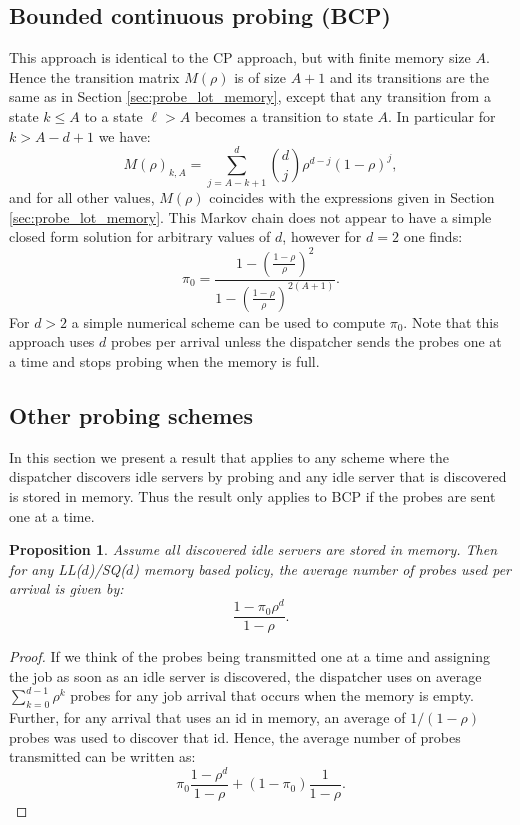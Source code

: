 \documentclass[12pt]{report}
\newtheorem{proposition}[theorem]{Proposition}
\begin{document}
\subsection{Bounded continuous probing (BCP)}
This approach is identical to the CP approach, but with finite memory size $A$. 
Hence the transition matrix $M(\rho)$ is of size $A+1$ and its transitions are the same as in Section \ref{sec:probe_lot_memory}, except that any transition from a state $k \leq A$
to a state $\ell > A$ becomes a transition to state $A$. In particular for $k > A-d+1$ we have:
$$
M(\rho)_{k,A}
=
\sum_{j=A-k+1}^d \binom{d}{j} \rho^{d-j} (1-\rho)^{j},
$$
and for all other values, $M(\rho)$ coincides with the expressions given in Section \ref{sec:probe_lot_memory}. This Markov chain does not appear to have a simple closed form solution for arbitrary values of $d$, however for $d=2$ one finds: 
$$
\pi_0=\frac{1-\left(\frac{1-\rho}{\rho}\right)^2}{1-\left(\frac{1-\rho}{\rho}\right)^{2(A+1)}}.
$$
For $d>2$ a simple numerical scheme can be used to compute $\pi_0$. 
Note that this approach uses $d$ probes per arrival unless the dispatcher sends the probes one at a
time and stops probing when the memory is full.

\subsection{Other probing schemes}
In this section we present a result that applies to any scheme where the dispatcher 
discovers idle servers by probing and any idle server that is discovered is stored in memory.
Thus the result only applies to BCP if the probes are sent one at a time.
 
\begin{proposition}\label{prop:nr_probes}
Assume all discovered idle servers are stored in memory. Then for 
any LL($d$)/SQ($d$) memory based policy, the average number of probes used 
per arrival is given by:
\begin{equation}
\frac{1-\pi_0 \rho^d}{1-\rho}.
\label{eq:nr_probes}
\end{equation}
\end{proposition}
\begin{proof}
If we think of the probes being transmitted one at a time
and assigning the job as soon as an idle server is discovered, the dispatcher uses on average
$\sum_{k=0}^{d-1} \rho^k$ probes for any job arrival that occurs when the memory is
empty. Further, for any arrival that uses an id in memory, an average of $1/(1-\rho)$ probes was
used to discover that id. Hence, the average number of probes transmitted can be written as:
$$
\pi_0 \frac{1-\rho^d}{1-\rho}+ (1-\pi_0) \frac{1}{1-\rho}.
$$
\end{proof}
\end{document}

